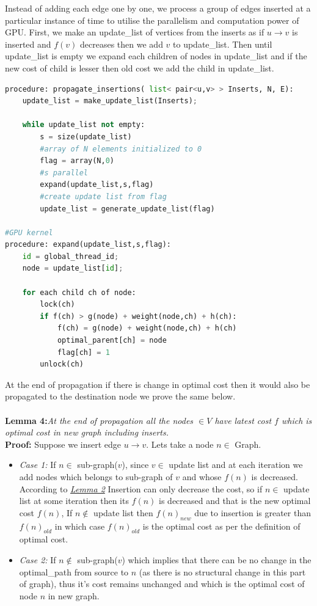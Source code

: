 \documentclass[a4paper]{article}
\begin{document}
Instead of adding each edge one by one, we process a group of edges inserted at a particular instance of time to utilise the parallelism and computation power of GPU. First, we make an update\_list of vertices from the inserts as if $u \rightarrow v $ is inserted and $f(v)$ decreases then we add $v$ to update\_list. Then until update\_list is empty we expand each children of nodes in update\_list and if the new cost of child is lesser then old cost we add the child in update\_list.
\begin{lstlisting}[language=python, caption=Propagation of Insertions]
procedure: propagate_insertions( list< pair<u,v> > Inserts, N, E):
    update_list = make_update_list(Inserts);
                          
    while update_list not empty:
        s = size(update_list)
        #array of N elements initialized to 0
        flag = array(N,0)
        #s parallel
        expand(update_list,s,flag)
        #create update list from flag
        update_list = generate_update_list(flag)
        
#GPU kernel
procedure: expand(update_list,s,flag):
    id = global_thread_id;
    node = update_list[id];
    
    for each child ch of node:
        lock(ch)
        if f(ch) > g(node) + weight(node,ch) + h(ch):
            f(ch) = g(node) + weight(node,ch) + h(ch)  
            optimal_parent[ch] = node
            flag[ch] = 1
        unlock(ch)


\end{lstlisting}
At the end of propagation if there is change in optimal cost then it would also be propagated to the destination node we prove the same below.\\
\\
\hypertarget{Lemma 4}{\textbf{Lemma 4:}}\textit{At the end of propagation all the nodes $\in V$ have latest cost $f$ which is optimal cost in new graph including inserts.}\\
\textbf{Proof:} Suppose we insert edge $u \rightarrow v$. Lets take a node $n \in$ Graph.
\begin{itemize}[label={}]
    \item \textit{Case 1:} If $n \in$ sub-graph($v$), since $v \in$ update list and at each iteration we add nodes which belongs to sub-graph of $v$ and whose $f(n)$ is decreased. According to \hyperlink{Lemma 2}{\textit{Lemma 2}} Insertion can only decrease the cost, so if $n \in$ update list at some iteration then its $f(n)$ is decreased and that is the new optimal cost $f(n)$, If $n \notin$ update list then $f(n)_{new}$ due to insertion is greater than $f(n)_{old}$ in which case $f(n)_{old}$ is the optimal cost as per the definition of optimal cost.
    \item \textit{Case 2:} If $n \notin$ sub-graph($v$) which implies that there can be no change in the optimal\_path from source to $n$ (as there is no structural change in this part of graph), thus it's cost remains unchanged and which is the optimal cost of node $n$ in new graph.
\end{itemize}
\end{document}
